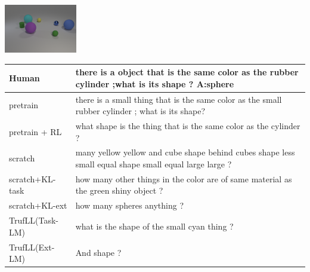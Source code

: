 \documentclass{article}
\newcommand{\algo}{TrufLL\xspace}
\begin{document}
\begin{table}[t!]
  \begin{minipage}{0.2\linewidth}
        \includegraphics[width=120px]{./CLEVR_val_004958.png}
	\end{minipage}
	\hspace{1.2cm}
	\begin{minipage}{0.80\linewidth}
		\scriptsize
		\begin{tabular}{ll}
			Human           & there is a object that is the same color as the rubber cylinder ;what is its shape ? \quad \textbf{A:sphere} \\
			\midrule
			pretrain        & there is a small thing that is the same color as the small rubber cylinder ; what is its shape? \\
		    pretrain + RL   & what shape is the thing that is the same color as the cylinder ? \\ \midrule
			scratch         & many yellow yellow and cube shape behind cubes shape less small equal shape small equal large large ?  \\
			scratch+KL-task & how many other things in the color are of same material as the green shiny object ? \\
			scratch+KL-ext  & how many spheres anything ?\\ \midrule
			\algo(Task-LM) & what is the shape of the small cyan thing ? \\
			\algo(Ext-LM)   & And shape ? \\
			\bottomrule
		\end{tabular}
	\end{minipage}
	\vspace{1mm}



\end{table}
\end{document}
